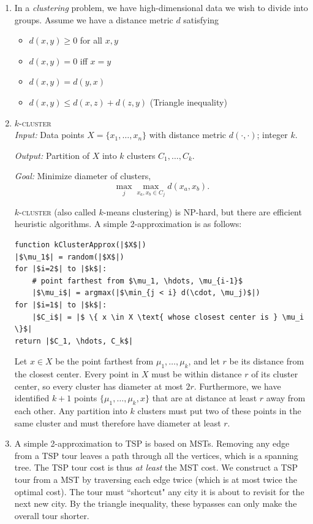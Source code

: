 \documentclass[10pt]{article}
\begin{document}
\begin{multicols}{2}
\begin{addmargin}[0.8em]{0.5em}
\begin{enumerate}[label=(\alph*)]
        \item In a \textit{clustering} problem, we have high-dimensional data we wish to divide into groups. Assume we have a distance metric $d$ satisfying
        \begin{itemize}
        \item $d(x,y) \geq 0$ for all $x,y$
        \item $d(x,y) = 0$ iff $x=y$
        \item $d(x,y) = d(y,x)$
        \item $d(x,y) \leq d(x,z) + d(z,y)$ (Triangle inequality)
        \end{itemize}
        
        \item $k$-\textsc{cluster} \\
        \textit{Input:} Data points $X = \{ x_1, \hdots, x_n \}$ with distance metric $d(\cdot, \cdot)$; integer $k$.
        
        \textit{Output:} Partition of $X$ into $k$ clusters $C_1, \hdots, C_k$. 
        
        \textit{Goal:} Minimize diameter of clusters,
        $$
        \max_{j} \max_{x_a, x_b \in C_j} d(x_a, x_b).
        $$
        
        $k$-\textsc{cluster} (also called $k$-means clustering) is NP-hard, but there are efficient heuristic algorithms. A simple 2-approximation is as follows:
        \begin{verbatim}
function kClusterApprox(|$X$|)
|$\mu_1$| = random(|$X$|)
for |$i=2$| to |$k$|:
    # point farthest from $\mu_1, \hdots, \mu_{i-1}$
    |$\mu_i$| = argmax(|$\min_{j < i} d(\cdot, \mu_j)$|)
for |$i=1$| to |$k$|:
    |$C_i$| = |$ \{ x \in X \text{ whose closest center is } \mu_i \}$|
return |$C_1, \hdots, C_k$|
        \end{verbatim}        
        Let $x \in X$ be the point farthest from $\mu_1, \hdots, \mu_k$, and let $r$ be its distance from the closest center. Every point in $X$ must be within distance $r$ of its cluster center, so every cluster has diameter at most $2r$. Furthermore, we have identified $k+1$ points $\{ \mu_1, \hdots, \mu_k, x\}$ that are at distance at least $r$ away from each other. Any partition into $k$ clusters must put two of these points in the same cluster and must therefore have diameter at least $r$.
        
        \item A simple 2-approximation to \textsc{TSP} is based on MSTs. Removing any edge from a TSP tour leaves a path through all the vertices, which is a spanning tree. The TSP tour cost is thus \textit{at least} the MST cost. We construct a TSP tour from a MST by traversing each edge twice (which is at most twice the optimal cost). The tour must ``shortcut" any city it is about to revisit for the next new city. By the triangle inequality, these bypasses can only make the overall tour shorter.
        

\end{enumerate}
\end{addmargin}
\end{multicols}
\end{document}
